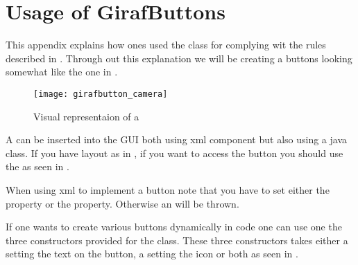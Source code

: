 \chapter{Usage of GirafButtons}
\label{app:usage_of_girafbuttons}

This appendix explains how ones used the class  for complying wit the rules described in . Through out this explanation we will be creating a buttons looking somewhat like the one in .

\begin{figure}[h]
	\centering
	\texttt{[image: girafbutton\_camera]}
	\caption{Visual representaion of a }
	\label{fig:girafbutton_camera}
\end{figure}
\noindent



A  can be inserted into the GUI both using xml component but also using a java class. If you have layout as in , if you want to access the button you should use the  as seen in .

\begin{note}
	When using xml to implement a button note that you have to set either the  property or the  property. Otherwise an  will be thrown.
\end{note}


\noindent
If one wants to create various buttons dynamically in code one can use one the three constructors provided for the  class. These three constructors takes either a  setting the text on the button, a  setting the icon or both as seen in .
